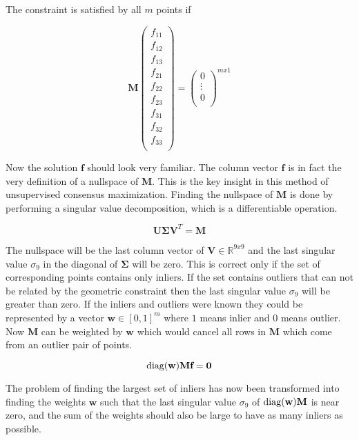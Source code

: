 The constraint is satisfied by all $m$ points if

\begin{equation}
\textbf{M}
\begin{pmatrix}
f_{11} \\
f_{12} \\
f_{13} \\
f_{21} \\
f_{22} \\
f_{23} \\
f_{31} \\
f_{32} \\
f_{33} \\
\end{pmatrix}
=
\begin{pmatrix}
0 \\
\vdots \\
0 \\
\end{pmatrix}
^{mx1}
\end{equation}

Now the solution $\textbf{f}$ should look very familiar. The column vector $\textbf{f}$ is in fact the very definition of a nullspace of $\mathbf{M}$. This is the key insight in this method of unsupervised consensus maximization. Finding the nullspace of $\mathbf{M}$ is done by performing a singular value decomposition, which is a differentiable operation.

\begin{equation}
\mathbf{U}\mathbf{\Sigma}\mathbf{V}^T=\mathbf{M}
\end{equation}

The nullspace will be the last column vector of $\mathbf{V} \in \mathbb{R}^{9x9}$ and the last singular value $\sigma_9$ in the diagonal of $\mathbf{\Sigma}$ will be zero. This is correct only if the set of corresponding points contains only inliers. If the set contains outliers that can not be related by the geometric constraint then the last singular value $\sigma_9$ will be greater than zero. If the inliers and outliers were known they could be represented by a vector $\textbf{w} \in [0,1]^m$ where $ 1 $ means inlier and $ 0 $ means outlier. Now $\mathbf{M}$ can be weighted by $\textbf{w}$ which would cancel all rows in $\mathbf{M}$ which come from an outlier pair of points.

\[
\operatorname{diag}(\textbf{w}) \mathbf{M} \textbf{f} = \textbf{0}
\] 

The problem of finding the largest set of inliers has now been transformed into finding the weights $\textbf{w}$ such that the last singular value $\sigma_9$ of $\operatorname{diag}(\textbf{w})\mathbf{M}$ is near zero, and the sum of the weights should also be large to have as many inliers as possible.

